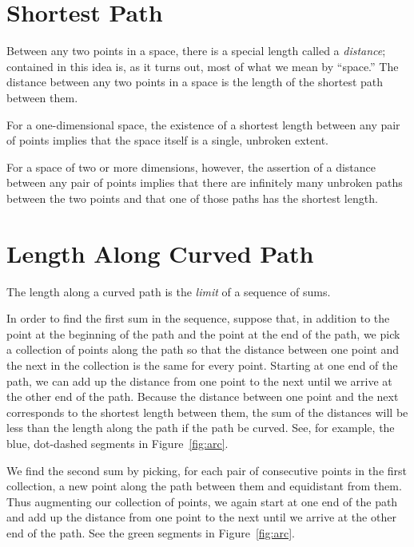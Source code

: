 \section{Shortest Path}

Between any two points in a space, there is a special length called a
\emph{distance}; contained in this idea is, as it turns out, most of what we
mean by ``space.'' The distance between any two points in a space is the length
of the shortest path between them.

For a one-dimensional space, the existence of a shortest length between any
pair of points implies that the space itself is a single, unbroken extent.

For a space of two or more dimensions, however, the assertion of a distance
between any pair of points implies that there are infinitely many unbroken
paths between the two points and that one of those paths has the shortest
length.

\section{Length Along Curved Path}

The length along a curved path is the \emph{limit} of a sequence of sums.

In order to find the first sum in the sequence, suppose that, in addition to
the point at the beginning of the path and the point at the end of the path, we
pick a collection of points along the path so that the distance between one
point and the next in the collection is the same for every point.  Starting at
one end of the path, we can add up the distance from one point to the next
until we arrive at the other end of the path.  Because the distance between one
point and the next corresponds to the shortest length between them, the sum of
the distances will be less than the length along the path if the path be
curved.  See, for example, the blue, dot-dashed segments in
Figure~\ref{fig:arc}.

We find the second sum by picking, for each pair of consecutive points in the
first collection, a new point along the path between them and equidistant from
them.  Thus augmenting our collection of points, we again start at one end of
the path and add up the distance from one point to the next until we arrive at
the other end of the path.  See the green segments in Figure~\ref{fig:arc}.

